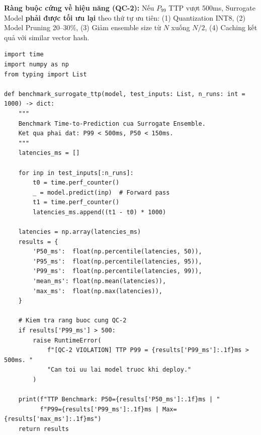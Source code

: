 \begin{tcolorbox}[dangerbox]
\textbf{Ràng buộc cứng về hiệu năng (QC-2):} Nếu $P_{99}$ TTP vượt 500ms, Surrogate Model \textbf{phải được tối ưu lại} theo thứ tự ưu tiên: (1) Quantization INT8, (2) Model Pruning 20--30\%, (3) Giảm ensemble size từ $N$ xuống $N/2$, (4) Caching kết quả với similar vector hash.
\end{tcolorbox}

\begin{lstlisting}[caption={Benchmark TTP với percentile đo lường},label={lst:benchmark}]
import time
import numpy as np
from typing import List

def benchmark_surrogate_ttp(model, test_inputs: List, n_runs: int = 1000) -> dict:
    """
    Benchmark Time-to-Prediction cua Surrogate Ensemble.
    Ket qua phai dat: P99 < 500ms, P50 < 150ms.
    """
    latencies_ms = []

    for inp in test_inputs[:n_runs]:
        t0 = time.perf_counter()
        _ = model.predict(inp)  # Forward pass
        t1 = time.perf_counter()
        latencies_ms.append((t1 - t0) * 1000)

    latencies = np.array(latencies_ms)
    results = {
        'P50_ms':  float(np.percentile(latencies, 50)),
        'P95_ms':  float(np.percentile(latencies, 95)),
        'P99_ms':  float(np.percentile(latencies, 99)),
        'mean_ms': float(np.mean(latencies)),
        'max_ms':  float(np.max(latencies)),
    }

    # Kiem tra rang buoc cung QC-2
    if results['P99_ms'] > 500:
        raise RuntimeError(
            f"[QC-2 VIOLATION] TTP P99 = {results['P99_ms']:.1f}ms > 500ms. "
            "Can toi uu lai model truoc khi deploy."
        )

    print(f"TTP Benchmark: P50={results['P50_ms']:.1f}ms | "
          f"P99={results['P99_ms']:.1f}ms | Max={results['max_ms']:.1f}ms")
    return results
\end{lstlisting}
